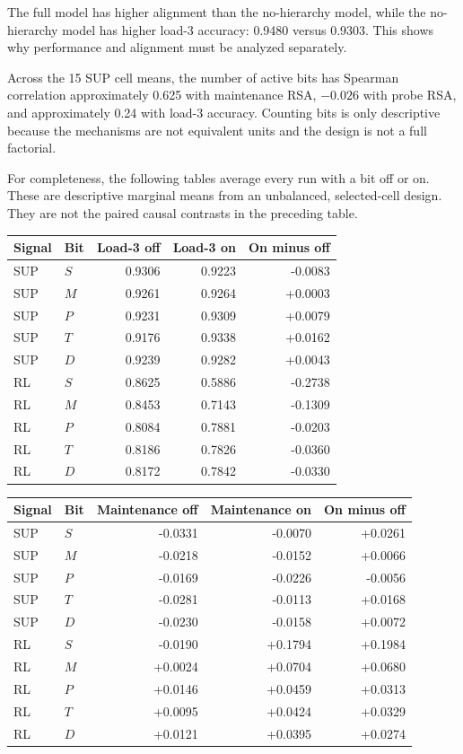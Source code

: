 \documentclass[
  10pt,
]{article}
\begin{document}
The full model has higher alignment than the no-hierarchy model, while
the no-hierarchy model has higher load-3 accuracy: 0.9480 versus 0.9303.
This shows why performance and alignment must be analyzed separately.

Across the 15 SUP cell means, the number of active bits has Spearman
correlation approximately 0.625 with maintenance RSA, \(-0.026\) with
probe RSA, and approximately 0.24 with load-3 accuracy. Counting bits is
only descriptive because the mechanisms are not equivalent units and the
design is not a full factorial.

For completeness, the following tables average every run with a bit off
or on. These are descriptive marginal means from an unbalanced,
selected-cell design. They are not the paired causal contrasts in the
preceding table.

\begin{longtable}[]{@{}llrrr@{}}
\toprule\noalign{}
Signal & Bit & Load-3 off & Load-3 on & On minus off \\
\midrule\noalign{}
\endhead
\bottomrule\noalign{}
\endlastfoot
SUP & \(S\) & 0.9306 & 0.9223 & -0.0083 \\
SUP & \(M\) & 0.9261 & 0.9264 & +0.0003 \\
SUP & \(P\) & 0.9231 & 0.9309 & +0.0079 \\
SUP & \(T\) & 0.9176 & 0.9338 & +0.0162 \\
SUP & \(D\) & 0.9239 & 0.9282 & +0.0043 \\
RL & \(S\) & 0.8625 & 0.5886 & -0.2738 \\
RL & \(M\) & 0.8453 & 0.7143 & -0.1309 \\
RL & \(P\) & 0.8084 & 0.7881 & -0.0203 \\
RL & \(T\) & 0.8186 & 0.7826 & -0.0360 \\
RL & \(D\) & 0.8172 & 0.7842 & -0.0330 \\
\end{longtable}

\begin{longtable}[]{@{}llrrr@{}}
\toprule\noalign{}
Signal & Bit & Maintenance off & Maintenance on & On minus off \\
\midrule\noalign{}
\endhead
\bottomrule\noalign{}
\endlastfoot
SUP & \(S\) & -0.0331 & -0.0070 & +0.0261 \\
SUP & \(M\) & -0.0218 & -0.0152 & +0.0066 \\
SUP & \(P\) & -0.0169 & -0.0226 & -0.0056 \\
SUP & \(T\) & -0.0281 & -0.0113 & +0.0168 \\
SUP & \(D\) & -0.0230 & -0.0158 & +0.0072 \\
RL & \(S\) & -0.0190 & +0.1794 & +0.1984 \\
RL & \(M\) & +0.0024 & +0.0704 & +0.0680 \\
RL & \(P\) & +0.0146 & +0.0459 & +0.0313 \\
RL & \(T\) & +0.0095 & +0.0424 & +0.0329 \\
RL & \(D\) & +0.0121 & +0.0395 & +0.0274 \\
\end{longtable}
\end{document}
